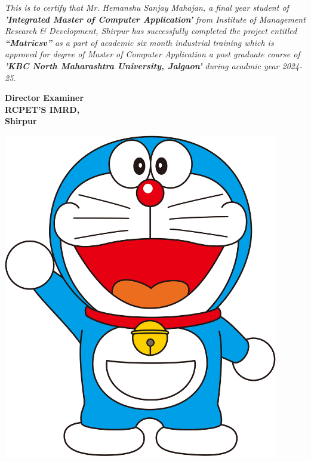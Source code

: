 \begin{flushleft}
\justifying
\begin{spacing}{2}


\textit{\large \textcolor{black}  This is to certify that Mr. Hemanshu Sanjay Mahajan, a final year student of \textbf {'Integrated Master of Computer Application'} from Institute of Management Research \& Development, Shirpur has successfully completed the project entitled \textbf{``Matricsv''} as a part of academic six month industrial training which is approved for degree of Master of Computer Application a post graduate course of \textbf {'KBC North Maharashtra University, Jalgaon'} during acadmic year 2024-25.}   \\[0.9cm]


\end{spacing}
\noindent
\textbf{Director \hspace{9cm} Examiner\\RCPET'S IMRD,\\ Shirpur}\\[1.5cm]


\newpage
\thispagestyle{empty}

\begin{center}
\vspace*{2cm}
\includegraphics[width=0.9\textwidth]{Certi/doraemon.png}
\end{center}



\end{flushleft}





